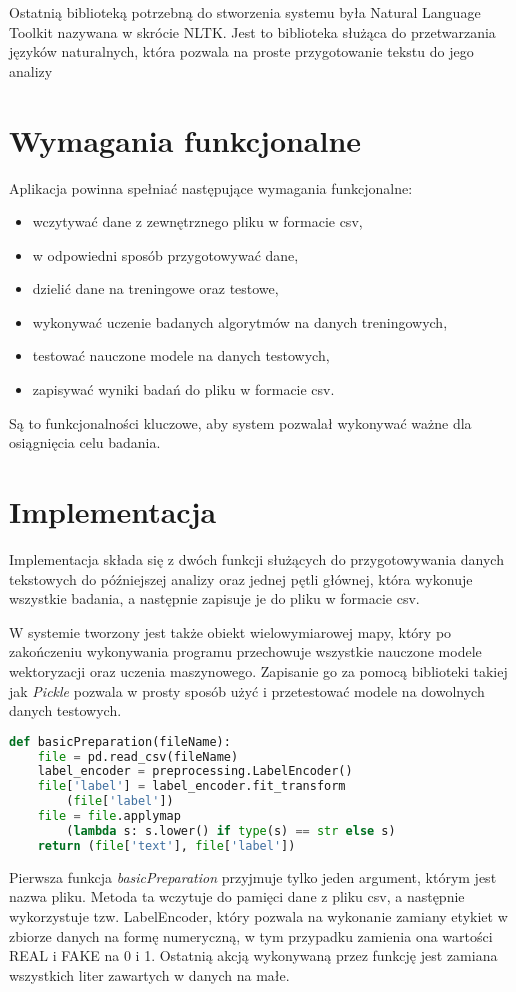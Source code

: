 Ostatnią biblioteką potrzebną do stworzenia systemu była Natural Language Toolkit nazywana w skrócie 
NLTK. Jest to biblioteka służąca do przetwarzania języków naturalnych, która pozwala na proste przygotowanie tekstu do jego analizy
\section{Wymagania funkcjonalne}
Aplikacja powinna spełniać następujące wymagania funkcjonalne: 
\begin{itemize}
    \item wczytywać dane z zewnętrznego pliku w formacie csv,
    \item w odpowiedni sposób przygotowywać dane,
    \item dzielić dane na treningowe oraz testowe,
    \item wykonywać uczenie badanych algorytmów na danych treningowych,
    \item testować nauczone modele na danych testowych,
    \item zapisywać wyniki badań do pliku w formacie csv.
\end{itemize}
Są to funkcjonalności kluczowe, aby system pozwalał wykonywać ważne dla osiągnięcia celu
badania. 
\section{Implementacja}
Implementacja składa się z dwóch funkcji służących do przygotowywania danych tekstowych
do późniejszej analizy oraz jednej pętli głównej, która wykonuje wszystkie badania,
a następnie zapisuje je do pliku w formacie csv. 

W systemie tworzony jest także obiekt
wielowymiarowej mapy, który po zakończeniu wykonywania programu przechowuje
wszystkie nauczone modele wektoryzacji oraz uczenia maszynowego. Zapisanie go za pomocą
biblioteki takiej jak \textit{Pickle} pozwala
w prosty sposób użyć i przetestować modele na dowolnych danych testowych. 


\begin{lstlisting}[language=Python, caption={Funkcja przygotowywująca dane pobrane z pliku csv}, captionpos=b, frame=single]
def basicPreparation(fileName): 
    file = pd.read_csv(fileName)
    label_encoder = preprocessing.LabelEncoder()
    file['label'] = label_encoder.fit_transform
        (file['label']) 
    file = file.applymap
        (lambda s: s.lower() if type(s) == str else s) 
    return (file['text'], file['label'])
\end{lstlisting}
Pierwsza funkcja \textit{basicPreparation} przyjmuje tylko jeden argument, którym jest
nazwa pliku. Metoda ta wczytuje do pamięci dane z pliku csv, a następnie wykorzystuje
tzw. LabelEncoder, który pozwala na wykonanie zamiany etykiet w zbiorze danych na formę
numeryczną, w tym przypadku zamienia ona wartości REAL i FAKE na 0 i 1. Ostatnią 
akcją wykonywaną przez funkcję jest zamiana wszystkich liter zawartych w danych na małe.

